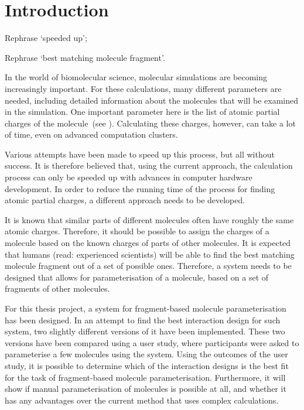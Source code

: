 \chapter{Introduction}

\begin{todo}
\item Rephrase `speeded up';
\item Rephrase `best matching molecule fragment'.
\end{todo}

In the world of biomolecular science, molecular simulations are becoming increasingly important. For these calculations, many different parameters are needed, including detailed information about the molecules that will be examined in the simulation. One important parameter here is the list of atomic partial charges of the molecule~(see ). Calculating these charges, however, can take a lot of time, even on advanced computation clusters.

Various attempts have been made to speed up this process, but all without success. It is therefore believed that, using the current approach, the calculation process can only be speeded up with advances in computer hardware development. In order to reduce the running time of the process for finding atomic partial charges, a different approach needs to be developed.

It is known that similar parts of different molecules often have roughly the same atomic charges. Therefore, it should be possible to assign the charges of a molecule based on the known charges of parts of other molecules. It is expected that humans (read: experienced scientists) will be able to find the best matching molecule fragment out of a set of possible ones. Therefore, a system needs to be designed that allows for parameterisation of a molecule, based on a set of fragments of other molecules.

For this thesis project, a system for fragment-based molecule parameterisation has been designed. In an attempt to find the best interaction design for such system, two slightly different versions of it have been implemented. These two versions have been compared using a user study, where participants were asked to parameterise a few molecules using the system. Using the outcomes of the user study, it is possible to determine which of the interaction designs is the best fit for the task of fragment-based molecule parameterisation. Furthermore, it will show if manual parameterisation of molecules is possible at all, and whether it has any advantages over the current method that uses complex calculations.

